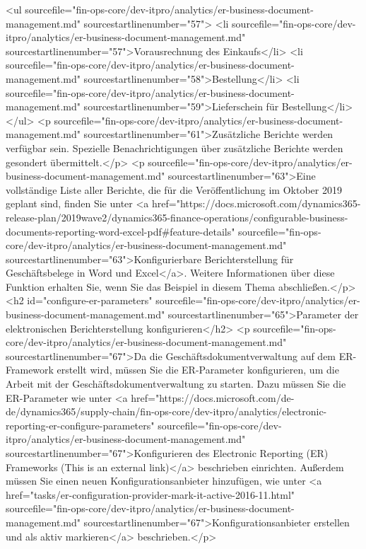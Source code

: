 <ul sourcefile="fin-ops-core/dev-itpro/analytics/er-business-document-management.md" sourcestartlinenumber="57">
<li sourcefile="fin-ops-core/dev-itpro/analytics/er-business-document-management.md" sourcestartlinenumber="57">Vorausrechnung des Einkaufs</li>
<li sourcefile="fin-ops-core/dev-itpro/analytics/er-business-document-management.md" sourcestartlinenumber="58">Bestellung</li>
<li sourcefile="fin-ops-core/dev-itpro/analytics/er-business-document-management.md" sourcestartlinenumber="59">Lieferschein für Bestellung</li>
</ul>
<p sourcefile="fin-ops-core/dev-itpro/analytics/er-business-document-management.md" sourcestartlinenumber="61">Zusätzliche Berichte werden verfügbar sein. Spezielle Benachrichtigungen über zusätzliche Berichte werden gesondert übermittelt.</p>
<p sourcefile="fin-ops-core/dev-itpro/analytics/er-business-document-management.md" sourcestartlinenumber="63">Eine vollständige Liste aller Berichte, die für die Veröffentlichung im Oktober 2019 geplant sind, finden Sie unter <a href="https://docs.microsoft.com/dynamics365-release-plan/2019wave2/dynamics365-finance-operations/configurable-business-documents-reporting-word-excel-pdf#feature-details" sourcefile="fin-ops-core/dev-itpro/analytics/er-business-document-management.md" sourcestartlinenumber="63">Konfigurierbare Berichterstellung für Geschäftsbelege in Word und Excel</a>. Weitere Informationen über diese Funktion erhalten Sie, wenn Sie das Beispiel in diesem Thema abschließen.</p>
<h2 id="configure-er-parameters" sourcefile="fin-ops-core/dev-itpro/analytics/er-business-document-management.md" sourcestartlinenumber="65">Parameter der elektronischen Berichterstellung konfigurieren</h2>
<p sourcefile="fin-ops-core/dev-itpro/analytics/er-business-document-management.md" sourcestartlinenumber="67">Da die Geschäftsdokumentverwaltung auf dem ER-Framework erstellt wird, müssen Sie die ER-Parameter konfigurieren, um die Arbeit mit der Geschäftsdokumentverwaltung zu starten. Dazu müssen Sie die ER-Parameter wie unter <a href="https://docs.microsoft.com/de-de/dynamics365/supply-chain/fin-ops-core/dev-itpro/analytics/electronic-reporting-er-configure-parameters" sourcefile="fin-ops-core/dev-itpro/analytics/er-business-document-management.md" sourcestartlinenumber="67">Konfigurieren des Electronic Reporting (ER) Frameworks (This is an external link)</a> beschrieben einrichten. Außerdem müssen Sie einen neuen Konfigurationsanbieter hinzufügen, wie unter <a href="tasks/er-configuration-provider-mark-it-active-2016-11.html" sourcefile="fin-ops-core/dev-itpro/analytics/er-business-document-management.md" sourcestartlinenumber="67">Konfigurationsanbieter erstellen und als aktiv markieren</a> beschrieben.</p>
